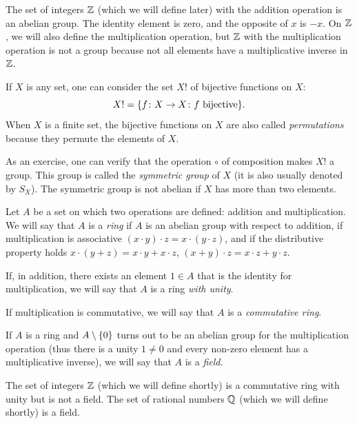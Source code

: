 \begin{example}
    The set of integers ${\mathbb Z}$ (which we will define later) with the addition
  operation is an abelian group. The identity element is zero, and the opposite
  of $x$ is $-x$. On ${\mathbb Z}$, we will also define the multiplication operation,
  but ${\mathbb Z}$ with the multiplication operation is not a group because not all
  elements have a multiplicative inverse in ${\mathbb Z}$.
\end{example}

\begin{example}
    If $X$ is any set, one can consider the set $X!$ of bijective functions on
  $X$:
  \[
    X! = {\left\{ f\colon X\to X\colon f \text{ bijective} \right\}}.
  \]
    When $X$ is a finite set, the bijective functions on $X$ are also called
  \emph{permutations} because they permute the elements of $X$.

    As an exercise, one can verify that the operation $\circ$ of composition
  makes $X!$ a group. This group is called the \emph{symmetric group} of $X$ (it
  is also usually denoted by $S_X$). The symmetric group is not abelian if $X$
  has more than two elements.
\end{example}

\begin{definition}
  \label{def:anello}%
  \label{def:campo}%
    Let $A$ be a set on which two operations are defined: addition and
  multiplication. We will say that $A$ is a \emph{ring} if $A$ is an abelian
  group with respect to addition, if multiplication is associative $(x\cdot
  y)\cdot z = x\cdot (y\cdot z)$, and if the distributive property holds
  $x\cdot(y+z) = x\cdot y + x\cdot z$, $(x+y)\cdot z = x\cdot z + y\cdot z$.

    If, in addition, there exists an element $1\in A$ that is the identity for
  multiplication, we will say that $A$ is a ring \emph{with unity}.

    If multiplication is commutative, we will say that $A$ is a
  \emph{commutative ring}.

    If $A$ is a ring and $A\setminus {\left\{ 0 \right\}}$ turns out to be an abelian
  group for the multiplication operation (thus there is a unity $1\neq 0$ and
  every non-zero element has a multiplicative inverse), we will say that $A$ is
  a \emph{field}.
\end{definition}

\begin{example}
    The set of integers ${\mathbb Z}$ (which we will define shortly) is a commutative
  ring with unity but is not a field. The set of rational numbers ${\mathbb Q}$ (which
  we will define shortly) is a field.
\end{example}

